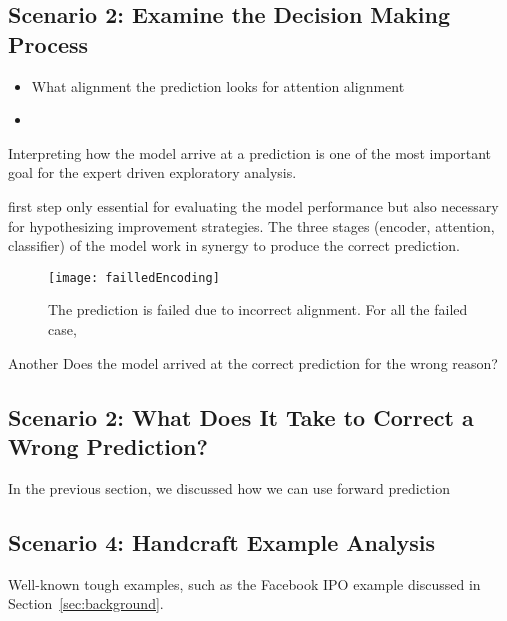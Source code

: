 \subsection{Scenario 2: Examine the Decision Making Process}
\begin{itemize}
\item What alignment the prediction looks for attention alignment
\item 
\end{itemize}

Interpreting how the model arrive at a prediction is one of the most important goal for the expert driven exploratory analysis.
%

 first step  only essential for evaluating the model performance but also necessary for hypothesizing improvement strategies.
%
The three stages (encoder, attention, classifier) of the model work in synergy to produce the correct prediction.

\begin{figure*}[t]
\centering
\vspace{-2mm}
 \texttt{[image: failledEncoding]}
 \caption{
The prediction is failed due to incorrect alignment. For all the failed case, 
 }
\label{fig:failedEncoding}
\end{figure*}



Another
Does the model arrived at the correct prediction for the wrong reason?

\subsection{Scenario 2: What Does It Take to Correct a Wrong Prediction?}
In the previous section, we discussed how we can use forward prediction



\subsection{Scenario 4: Handcraft Example Analysis}
Well-known tough examples, such as the Facebook IPO example discussed in Section~\ref{sec:background}.

